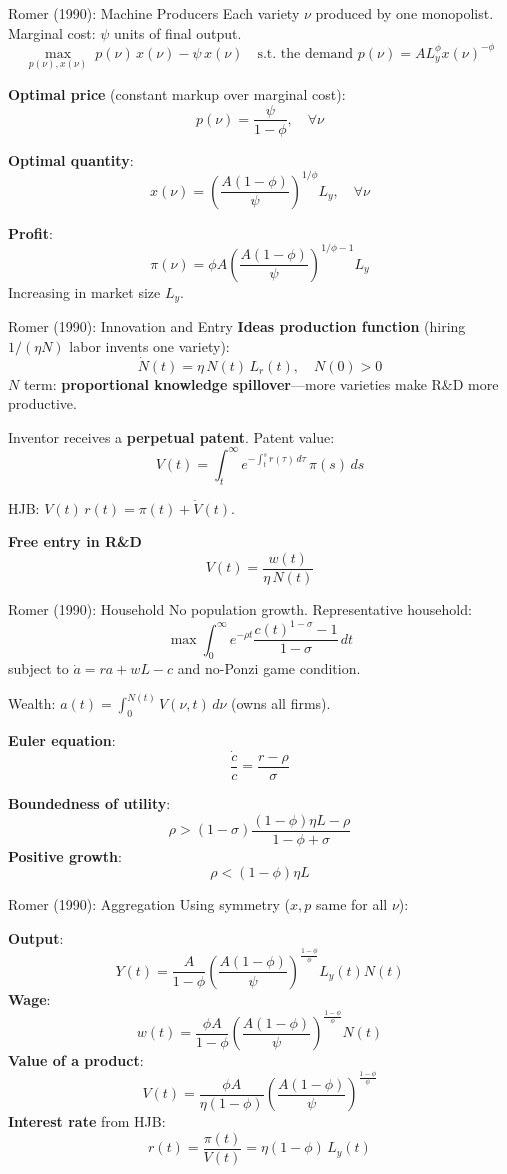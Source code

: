 \documentclass[blue]{beamer}
\begin{document}
	\begin{frame}{Romer (1990): Machine Producers}
		Each variety $\nu$ produced by one monopolist. Marginal cost: $\psi$ units of final output.
		\[
		\max_{p(\nu), x(\nu)}\; p(\nu)\, x(\nu) - \psi\, x(\nu) \quad \text{s.t. the demand $p(\nu) = A L_y^\phi x(\nu)^{-\phi}$} 
		\]
		
		\textbf{Optimal price} (constant markup over marginal cost):
		\[
		p(\nu) = \frac{\psi}{1-\phi}, \quad \forall\nu
		\]

		\textbf{Optimal quantity}:
		\[
		x(\nu) = \left(\frac{A(1-\phi)}{\psi}\right)^{1/\phi} L_y, \quad \forall\nu 
		\]
		
		\textbf{Profit}: 
		$$
		\pi(\nu) = \phi A\!\left(\frac{A(1-\phi)}{\psi}\right)^{1/\phi - 1} L_y
		$$
		Increasing in market size $L_y$.
	\end{frame}
	\begin{frame}{Romer (1990): Innovation and Entry}
		\textbf{Ideas production function} (hiring $1/(\eta N)$ labor invents one variety):
		\[
		\dot{N}(t) = \eta\, N(t)\, L_r(t), \quad N(0) > 0 
		\]
		$N$ term: \textbf{proportional knowledge spillover}---more varieties make R\&D more productive.
		
		\bigskip
		Inventor receives a \textbf{perpetual patent}. Patent value:
		\[
		V(t) = \int_t^\infty e^{-\int_t^s r(\tau)\, d\tau}\, \pi(s)\, ds
		\]
		
		HJB: $V(t)\, r(t) = \pi(t) + \dot{V}(t)$.
		
		\textbf{Free entry in R\&D}
		\[
		V(t) = \frac{w(t)}{\eta\, N(t)} 
		\]
	\end{frame}
	
	
	\begin{frame}{Romer (1990): Household}
		No population growth. Representative household:
		\[
		\max \int_0^\infty e^{-\rho t} \frac{c(t)^{1-\sigma} - 1}{1-\sigma}\, dt 
		\]
		subject to $\dot{a} = ra + wL - c$ and no-Ponzi game condition.
		
		Wealth: $a(t) = \int_0^{N(t)} V(\nu, t)\, d\nu$ (owns all firms).
		
		\textbf{Euler equation}:
		\[
		\frac{\dot{c}}{c} = \frac{r - \rho}{\sigma}
		\]
		
		\textbf{Boundedness of utility}: 
		$$
		\rho > (1-\sigma)\frac{(1-\phi)\eta L - \rho}{1-\phi+\sigma}
		$$
		\textbf{Positive growth}:
		$$
		\rho < (1-\phi)\eta L
		$$
	\end{frame}
	
	\begin{frame}{Romer (1990): Aggregation}
		Using symmetry ($x, p$ same for all $\nu$):
		
		\textbf{Output}: 
		$$
		Y(t) = \frac{A}{1-\phi}\left(\frac{A(1-\phi)}{\psi}\right)^{\frac{1-\phi}{\phi}} L_y(t) N(t)
		$$
		\textbf{Wage}: 
		$$
		w(t) = \frac{\phi A}{1-\phi}\!\left(\frac{A(1-\phi)}{\psi}\right)^{\frac{1-\phi}{\phi}} N(t)
		$$
		\textbf{Value of a product}:
		\[
		V(t) = \frac{\phi A}{\eta(1-\phi)}\!\left(\frac{A(1-\phi)}{\psi}\right)^{\frac{1-\phi}{\phi}} 
		\]
		\textbf{Interest rate} from HJB:
		\[
		r(t) = \frac{\pi(t)}{V(t)} = \eta(1-\phi)\, L_y(t)
		\]
	\end{frame}
	
\end{document}
